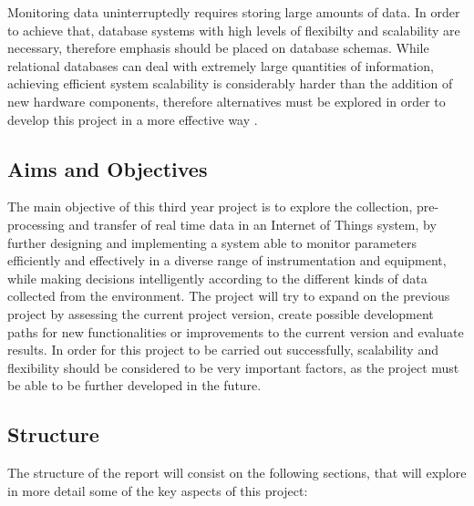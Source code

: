 \documentclass[12pt]{article}
\begin{document}
Monitoring data uninterruptedly requires storing large amounts of data. In order to achieve that, database systems with high levels of flexibilty and scalability are necessary, therefore emphasis should be placed on database schemas. While relational databases can deal with extremely large quantities of information, achieving efficient system scalability is considerably harder than the addition of new hardware components, therefore alternatives must be explored in order to develop this project in a more effective way \cite{nasar2019suitability}. 

\subsection{Aims and Objectives}

The main objective of this third year project is to explore the collection, pre-processing and transfer of real time data in an Internet of Things system, by further designing and implementing a system able to monitor parameters efficiently and effectively in a diverse range of instrumentation and equipment, while making decisions intelligently according to the different kinds of data collected from the environment. The project will try to expand on the previous project by assessing the current project version, create possible development paths for new functionalities or improvements to the current version and evaluate results. In order for this project to be carried out successfully, scalability and flexibility should be considered to be very important factors, as the project must be able to be further developed in the future.

\subsection{Structure} 

The structure of the report will consist on the following sections, that will explore in more detail some of the key aspects of this project:
\end{document}
